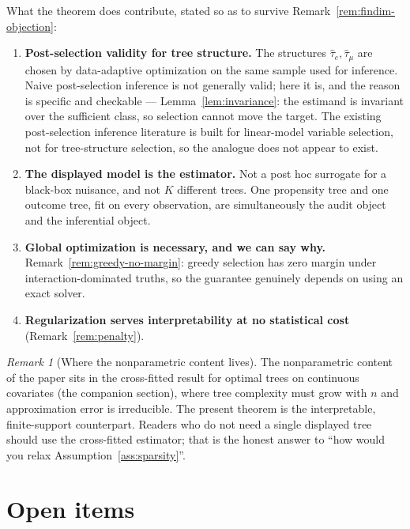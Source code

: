 \documentclass[11pt]{article}
\theoremstyle{plain}
\theoremstyle{definition}
\theoremstyle{remark}
\newtheorem{remark}{Remark}
\newcommand{\that}{\widehat{\tau}}
\begin{document}
What the theorem does contribute, stated so as to survive
Remark~\ref{rem:findim-objection}:
\begin{enumerate}[label=(C\arabic*),leftmargin=*]
  \item \textbf{Post-selection validity for tree structure.} The structures
  $\that_e,\that_\mu$ are chosen by data-adaptive optimization on the same sample
  used for inference. Naive post-selection inference is not generally valid;
  here it is, and the reason is specific and checkable ---
  Lemma~\ref{lem:invariance}: the estimand is invariant over the sufficient
  class, so selection cannot move the target. The existing post-selection
  inference literature is built for linear-model variable selection, not for
  tree-structure selection, so the analogue does not appear to exist.
  \item \textbf{The displayed model is the estimator.} Not a post hoc surrogate
  for a black-box nuisance, and not $K$ different trees. One propensity tree and
  one outcome tree, fit on every observation, are simultaneously the audit object
  and the inferential object.
  \item \textbf{Global optimization is necessary, and we can say why.}
  Remark~\ref{rem:greedy-no-margin}: greedy selection has zero margin under
  interaction-dominated truths, so the guarantee genuinely depends on using an
  exact solver.
  \item \textbf{Regularization serves interpretability at no statistical cost}
  (Remark~\ref{rem:penalty}).
\end{enumerate}

\begin{remark}[Where the nonparametric content lives]\label{rem:where-np}
The nonparametric content of the paper sits in the cross-fitted result for
optimal trees on continuous covariates (the companion section), where tree
complexity must grow with $n$ and approximation error is irreducible. The present
theorem is the interpretable, finite-support counterpart. Readers who do not need
a single displayed tree should use the cross-fitted estimator; that is the honest
answer to ``how would you relax Assumption~\ref{ass:sparsity}''.
\end{remark}

\section{Open items}
\end{document}
